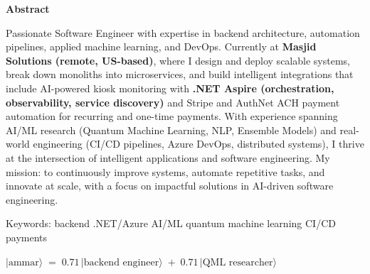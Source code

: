 \begin{center}
\begin{minipage}{0.88\textwidth}
  \begin{center}{\sffamily\bfseries\small Abstract}\end{center}
  \vspace{1pt}
  \small
  Passionate Software Engineer with expertise in backend architecture, automation pipelines, applied machine learning, and DevOps.
  Currently at \textbf{Masjid Solutions (remote, US-based)}, where I design and deploy scalable systems, break down monoliths into microservices,
  and build intelligent integrations that include AI-powered kiosk monitoring with \textbf{.NET Aspire (orchestration, observability, service discovery)}
  and Stripe and AuthNet ACH payment automation for recurring and one-time payments.
  With experience spanning AI/ML research (Quantum Machine Learning, NLP, Ensemble Models) and real-world engineering
  (CI/CD pipelines, Azure DevOps, distributed systems), I thrive at the intersection of intelligent applications and software engineering.
  My mission: to continuously improve systems, automate repetitive tasks, and innovate at scale, with a focus on impactful solutions
  in AI-driven software engineering.

  \vspace{5pt}
  {\ttfamily\footnotesize\color{gray}Keywords: backend .NET/Azure \textperiodcentered{} AI/ML \textperiodcentered{} quantum machine learning \textperiodcentered{} CI/CD \textperiodcentered{} payments}

  \vspace{4pt}
  \begin{center}
    \(|\mathrm{ammar}\rangle \;=\; 0.71\,|\text{backend engineer}\rangle \;+\; 0.71\,|\text{QML researcher}\rangle\)
  \end{center}
\end{minipage}
\end{center}
\vspace{-4pt}
